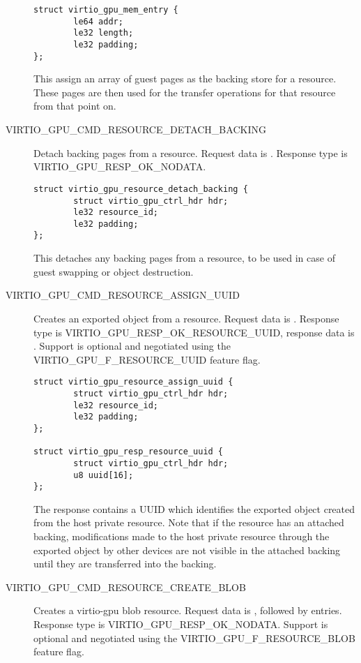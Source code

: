 \begin{description}
\begin{lstlisting}
struct virtio_gpu_mem_entry {
        le64 addr;
        le32 length;
        le32 padding;
};
\end{lstlisting}

This assign an array of guest pages as the backing store for a
resource. These pages are then used for the transfer operations for
that resource from that point on.

\item[VIRTIO_GPU_CMD_RESOURCE_DETACH_BACKING] Detach backing pages
  from a resource.  Request data is .  Response type is
  VIRTIO_GPU_RESP_OK_NODATA.

\begin{lstlisting}
struct virtio_gpu_resource_detach_backing {
        struct virtio_gpu_ctrl_hdr hdr;
        le32 resource_id;
        le32 padding;
};
\end{lstlisting}

This detaches any backing pages from a resource, to be used in case of
guest swapping or object destruction.

\item[VIRTIO_GPU_CMD_RESOURCE_ASSIGN_UUID] Creates an exported object from
  a resource. Request data is .  Response type is
  VIRTIO_GPU_RESP_OK_RESOURCE_UUID, response data is . Support is optional and negotiated
    using the VIRTIO_GPU_F_RESOURCE_UUID feature flag.

\begin{lstlisting}
struct virtio_gpu_resource_assign_uuid {
        struct virtio_gpu_ctrl_hdr hdr;
        le32 resource_id;
        le32 padding;
};

struct virtio_gpu_resp_resource_uuid {
        struct virtio_gpu_ctrl_hdr hdr;
        u8 uuid[16];
};
\end{lstlisting}

The response contains a UUID which identifies the exported object created from
the host private resource. Note that if the resource has an attached backing,
modifications made to the host private resource through the exported object by
other devices are not visible in the attached backing until they are transferred
into the backing.

\item[VIRTIO_GPU_CMD_RESOURCE_CREATE_BLOB] Creates a virtio-gpu blob
  resource. Request data is , followed by  entries. Response type is
  VIRTIO_GPU_RESP_OK_NODATA. Support is optional and negotiated
  using the VIRTIO_GPU_F_RESOURCE_BLOB feature flag.


\end{description}
